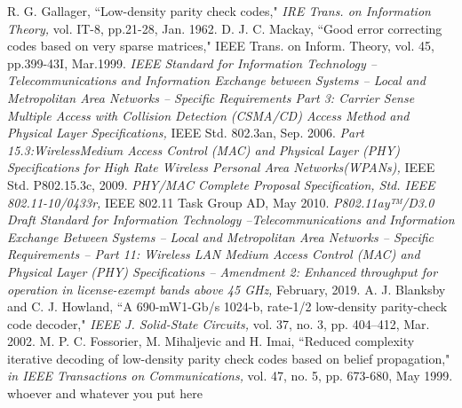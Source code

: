 \TSzTwelveTwenty\selectfont
\begin{thebibliography}{1}
	
	R. G. Gallager, ``Low-density parity check codes," \emph{IRE Trans. on Information Theory,} vol. IT-8, pp.21-28, Jan. 1962. 
	D. J. C. Mackay, ``Good error correcting codes based on very sparse matrices," IEEE Trans. on Inform. Theory, vol. 45, pp.399-43I, Mar.1999. 
	\emph{IEEE Standard for Information Technology – Telecommunications and
	Information Exchange between Systems – Local and Metropolitan Area
	Networks – Specific Requirements Part 3: Carrier Sense Multiple Access
	with Collision Detection (CSMA/CD) Access Method and Physical
	Layer Specifications,} IEEE Std. 802.3an, Sep. 2006.
	\emph{Part 15.3:WirelessMedium Access Control (MAC) and Physical Layer (PHY) Specifications for High Rate Wireless Personal Area Networks(WPANs),} IEEE Std. P802.15.3c, 2009.
	\emph{PHY/MAC Complete Proposal Specification, Std. IEEE 802.11-10/0433r,} IEEE 802.11 Task Group AD, May 2010.
	\emph{P802.11ay™/D3.0 Draft Standard for Information Technology –Telecommunications and Information Exchange Between Systems – Local and Metropolitan Area
	Networks – Specific Requirements – Part 11: Wireless LAN Medium Access Control (MAC) and Physical Layer (PHY) Specifications – Amendment 2: Enhanced throughput for operation in license-exempt bands above 45 GHz,} February, 2019.
	A. J. Blanksby and C. J. Howland, ``A 690-mW1-Gb/s 1024-b, rate-1/2 low-density parity-check code decoder," \emph{IEEE J. Solid-State Circuits,}
	vol. 37, no. 3, pp. 404–412, Mar. 2002.
	M. P. C. Fossorier, M. Mihaljevic and H. Imai, ``Reduced complexity iterative decoding of low-density parity check codes based on belief propagation," \emph{in IEEE Transactions on Communications,} vol. 47, no. 5, pp. 673-680, May 1999.
	whoever and whatever you put here
	\end{thebibliography}